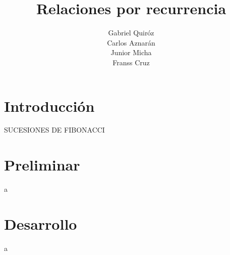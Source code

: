 \documentclass{report}
\title{Relaciones por recurrencia}
\author{Gabriel Quiróz\\Carlos Aznarán\\Junior Micha\\Franss Cruz\\}
\date{}
\begin{document}
\maketitle
\tableofcontents

\chapter*{Introducción}
SUCESIONES DE FIBONACCI

\chapter{Preliminar}
a
\chapter{Desarrollo}
a

\chapter{}
\end{document}
